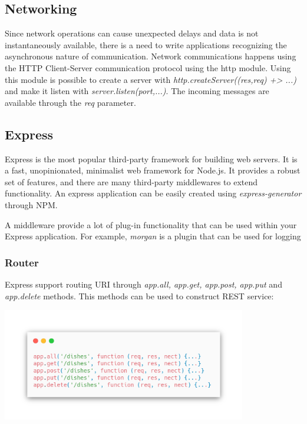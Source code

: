 \subsection*{Networking}
Since network operations can cause unexpected delays and data is not instantaneously available, there is a need to write applications recognizing the asynchronous nature of communication. Network communications happens using the HTTP Client-Server communication protocol using the http module. Using this module is possible to create a server with \textit{http.createServer((res,req) +> {...})} and make it listen with \textit{server.listen(port,...)}.
The incoming messages are available through the \textit{req} parameter.

\subsection*{Express}
Express is the most popular third-party framework for building web servers. It is a fast, unopinionated, minimalist web framework for Node.js. It provides a robust set of features, and there are many third-party middlewares to extend functionality. An express application can be easily created using \textit{express-generator} through NPM.

A middleware provide a lot of plug-in functionality that can be used within your Express application. For example, \textit{morgan} is a plugin that can be used for logging

\subsubsection*{Router}
Express support routing URI through \textit{app.all, app.get, app.post, app.put} and \textit{app.delete} methods. This methods can be used to construct REST service:

\begin{center}
    \includegraphics[width=0.8\textwidth]{assets/router.png}
\end{center}

